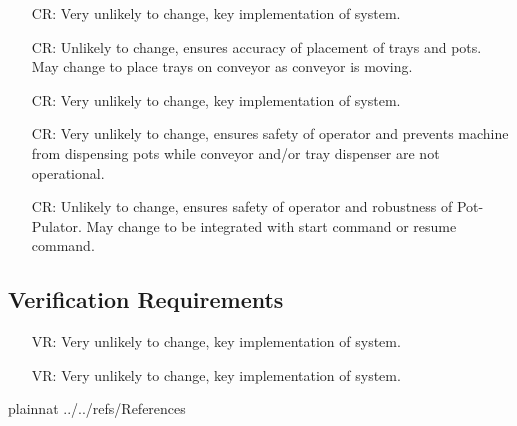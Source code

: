 \documentclass[12pt]{article}
\newcounter{creqnum} %
\newcounter{vreqnum} %
\newcounter{reqnum} %
\newcounter{lccreqnum} %
\newcounter{lcvreqnum} %
\begin{document}
\noindent \begin{itemize}

\item[CR\refstepcounter{lccreqnum}\thelccreqnum\label{LC_meaningfulLabel16}:] {Very unlikely to change,
  key implementation of system.}

\item[CR\refstepcounter{lccreqnum}\thelccreqnum\label{LC_meaningfulLabel17}:] {Unlikely to change,
  ensures accuracy of placement of trays and pots. May change to place trays on conveyor as conveyor
  is moving.}

\item[CR\refstepcounter{lccreqnum}\thelccreqnum\label{LC_meaningfulLabel18}:] {Very unlikely to change,
  key implementation of system.}

\item[CR\refstepcounter{lccreqnum}\thelccreqnum\label{LC_meaningfulLabel19}:] {Very unlikely to change,
    ensures safety of operator and prevents machine from dispensing pots while conveyor and/or tray dispenser
    are not operational.}

\item[CR\refstepcounter{lccreqnum}\thelccreqnum\label{LC_meaningfulLabel20}:] {Unlikely to change,
    ensures safety of operator and robustness of Pot-Pulator. May change to be integrated with start
    command or resume command.}

\end{itemize}

\subsection{Verification Requirements}

\noindent \begin{itemize}

\item[VR\refstepcounter{lcvreqnum}\thelcvreqnum\label{LC_meaningfulLabel21}:] {Very unlikely to change,
    key implementation of system.}

\item[VR\refstepcounter{lcvreqnum}\thelcvreqnum\label{LC_meaningfulLabel22}:] {Very unlikely to change,
    key implementation of system.}

\end{itemize}

\newpage

 {plainnat}
 {../../refs/References}
\end{document}
